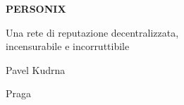 \thispagestyle{empty}
\begin{center}
  {\sffamily\bfseries\fontsize{34}{40}\selectfont PERSONIX\par}
  \vspace{2.2em}
  {\rmfamily\large Una rete di reputazione decentralizzata,\\[0.25em]
   incensurabile e incorruttibile\par}
\end{center}
\begin{center}
  {\rmfamily\Large Pavel Kudrna\par}
  \vspace{0.45em}
  {\rmfamily\small Praga\quad\textbullet{}\par}
\end{center}
\clearpage
